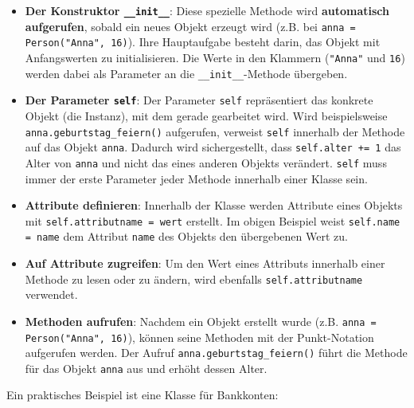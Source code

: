 \begin{itemize}
	\item \textbf{Der Konstruktor \lstinline|__init__|}: Diese spezielle Methode wird \textbf{automatisch aufgerufen}, sobald ein neues Objekt erzeugt wird (z.B. bei \lstinline|anna = Person("Anna", 16)|). Ihre Hauptaufgabe besteht darin, das Objekt mit Anfangswerten zu initialisieren. Die Werte in den Klammern (\lstinline|"Anna"| und \lstinline|16|) werden dabei als Parameter an die \lstinline|__init__|-Methode übergeben.

	\item \textbf{Der Parameter \lstinline|self|}: Der Parameter \lstinline|self| repräsentiert das konkrete Objekt (die Instanz), mit dem gerade gearbeitet wird. Wird beispielsweise \lstinline|anna.geburtstag_feiern()| aufgerufen, verweist \lstinline|self| innerhalb der Methode auf das Objekt \lstinline|anna|. Dadurch wird sichergestellt, dass \lstinline|self.alter += 1| das Alter von \lstinline|anna| und nicht das eines anderen Objekts verändert. \lstinline|self| muss immer der erste Parameter jeder Methode innerhalb einer Klasse sein.

	\item \textbf{Attribute definieren}: Innerhalb der Klasse werden Attribute eines Objekts mit \lstinline|self.attributname = wert| erstellt. Im obigen Beispiel weist \lstinline|self.name = name| dem Attribut \lstinline|name| des Objekts den übergebenen Wert zu.

	\item \textbf{Auf Attribute zugreifen}: Um den Wert eines Attributs innerhalb einer Methode zu lesen oder zu ändern, wird ebenfalls \lstinline|self.attributname| verwendet.

	\item \textbf{Methoden aufrufen}: Nachdem ein Objekt erstellt wurde (z.B. \lstinline|anna = Person("Anna", 16)|), können seine Methoden mit der Punkt-Notation aufgerufen werden. Der Aufruf \lstinline|anna.geburtstag_feiern()| führt die Methode für das Objekt \lstinline|anna| aus und erhöht dessen Alter.
\end{itemize}


\begin{myexample}
Ein praktisches Beispiel ist eine Klasse für Bankkonten:


\end{myexample}

